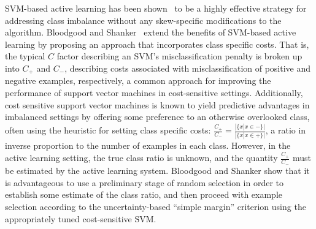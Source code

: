 SVM-based active learning has been shown~\cite{Ertekin2_2007} to be a highly effective strategy for addressing class imbalance without any skew-specific modifications to the algorithm. Bloodgood and Shanker~\cite{bloodgood2009imbalance} extend the benefits of SVM-based active learning by proposing an approach that incorporates class specific costs. That is, the typical $C$ factor describing an SVM's misclassification penalty is broken up into $C_+$ and $C_-$, describing costs associated with misclassification of positive and negative examples, respectively, a common approach for improving the performance of support vector machines in cost-sensitive settings. Additionally, cost sensitive support vector machines is known to yield predictive advantages in imbalanced settings by offering some preference to an otherwise overlooked class, often using the heuristic for setting class specific costs:  $\frac{C_+}{C_-} = \frac{|\{x | x \in -\}|}{|\{x | x \in +\}|}$, a ratio in inverse proportion to the number of examples in each class. However, in the active learning setting, the true class ratio is unknown, and the quantity  $\frac{C_+}{C_-}$ must be estimated by the active learning system. Bloodgood and Shanker show that it is advantageous to use a preliminary stage of random selection in order to establish some estimate of the class ratio, and then proceed with example selection according to the uncertainty-based ``simple margin'' criterion using the appropriately tuned cost-sensitive SVM.


